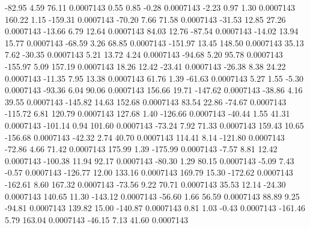       -82.95        4.59       76.11     0.0007143
        0.55        0.85       -0.28     0.0007143
       -2.23        0.97        1.30     0.0007143
      160.22        1.15     -159.31     0.0007143
      -70.20        7.66       71.58     0.0007143
      -31.53       12.85       27.26     0.0007143
      -13.66        6.79       12.64     0.0007143
       84.03       12.76      -87.54     0.0007143
      -14.02       13.94       15.77     0.0007143
      -68.59        3.26       68.85     0.0007143
     -151.97       13.45      148.50     0.0007143
       35.13        7.62      -30.35     0.0007143
        5.21       13.72        4.24     0.0007143
      -94.68        5.20       95.78     0.0007143
     -155.97        5.09      157.19     0.0007143
       18.26       12.42      -23.41     0.0007143
      -26.38        8.38       24.22     0.0007143
      -11.35        7.95       13.38     0.0007143
       61.76        1.39      -61.63     0.0007143
        5.27        1.55       -5.30     0.0007143
      -93.36        6.04       90.06     0.0007143
      156.66       19.71     -147.62     0.0007143
      -38.86        4.16       39.55     0.0007143
     -145.82       14.63      152.68     0.0007143
       83.54       22.86      -74.67     0.0007143
     -115.72        6.81      120.79     0.0007143
      127.68        1.40     -126.66     0.0007143
      -40.44        1.55       41.31     0.0007143
     -101.14        0.94      101.60     0.0007143
      -73.24        7.92       71.33     0.0007143
      159.43       10.65     -156.68     0.0007143
      -42.32        2.74       40.70     0.0007143
      114.41        8.14     -121.80     0.0007143
      -72.86        4.66       71.42     0.0007143
      175.99        1.39     -175.99     0.0007143
       -7.57        8.81       12.42     0.0007143
     -100.38       11.94       92.17     0.0007143
      -80.30        1.29       80.15     0.0007143
       -5.09        7.43       -0.57     0.0007143
     -126.77       12.00      133.16     0.0007143
      169.79       15.30     -172.62     0.0007143
     -162.61        8.60      167.32     0.0007143
      -73.56        9.22       70.71     0.0007143
       35.53       12.14      -24.30     0.0007143
      140.65       11.30     -143.12     0.0007143
      -56.60        1.66       56.59     0.0007143
       88.89        9.25      -94.81     0.0007143
      139.82       15.00     -140.87     0.0007143
        0.81        1.03       -0.43     0.0007143
     -161.46        5.79      163.04     0.0007143
      -46.15        7.13       41.60     0.0007143
